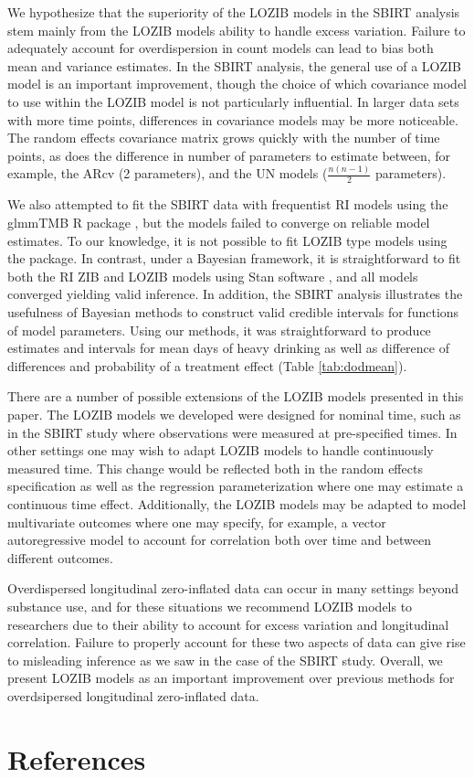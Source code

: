 \documentclass[12pt]{article}
\begin{document}
We hypothesize that the superiority of the LOZIB models in the SBIRT analysis stem mainly from the LOZIB models ability to handle excess variation. Failure to adequately account for overdispersion in count models can lead to bias both mean and variance estimates. In the SBIRT analysis, the general use of a LOZIB model is an important improvement, though the choice of which covariance model to use within the LOZIB model is not particularly influential. In larger data sets with more time points, differences in covariance models may be more noticeable. The random effects covariance matrix grows quickly with the number of time points, as does the difference in number of parameters to estimate between, for example, the ARcv (2 parameters), and the UN models ($\frac{n (n-1)}{2}$ parameters).  

We also attempted to fit the SBIRT data with frequentist RI models using the glmmTMB R package \citep{brooks2017glmmtmb}, but the models failed to converge on reliable model estimates. To our knowledge, it is not possible to fit LOZIB type models using the package. In contrast, under a Bayesian framework, it is straightforward to fit both the RI ZIB and LOZIB models using Stan software \citep{gelman2015stan}, and all models converged yielding valid inference. In addition, the SBIRT analysis illustrates the usefulness of Bayesian methods to construct valid credible intervals for functions of model parameters. Using our methods, it was straightforward to produce estimates and intervals for mean days of heavy drinking as well as difference of differences and probability of a treatment effect (Table \ref{tab:dodmean}).

There are a number of possible extensions of the LOZIB models presented in this paper. The LOZIB models we developed were designed for nominal time, such as in the SBIRT study where observations were measured at pre-specified times. In other settings one may wish to adapt LOZIB models to handle continuously measured time. This change would be reflected both in the random effects specification as well as the regression parameterization where one may estimate a continuous time effect. Additionally, the LOZIB models may be adapted to model multivariate outcomes where one may specify, for example, a vector autoregressive model to account for correlation both over time and between different outcomes.

Overdispersed longitudinal zero-inflated data can occur in many settings beyond substance use, and for these situations we recommend LOZIB models to researchers due to their ability to account for excess variation and longitudinal correlation. Failure to properly account for these two aspects of data can give rise to misleading inference as we saw in the case of the SBIRT study. Overall, we present LOZIB models as an important improvement over previous methods for overdsipersed longitudinal zero-inflated data.


\newpage

\section{References}


\end{document}
